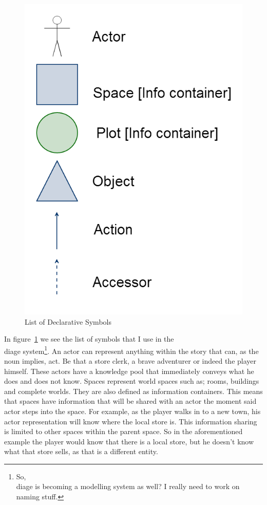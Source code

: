 \documentclass[11pt,a4paper,onecolumn,titlepage]{article}
\newcommand{\diage}{\textsl{Diage }}
\begin{document}
\begin{figure}
\includegraphics[scale=0.3]{symbols}
\caption{List of Declarative Symbols}
\label{fig:symbols}
\end{figure}
In figure~\ref{fig:symbols} we see the list of symbols that I use in the \\diage system\footnote{So, \\diage is becoming a modelling system as well? I really need to work on naming stuff.}. An actor can represent anything within the story that can, as the noun implies, act. Be that a store clerk, a brave adventurer or indeed the player himself. These actors have a knowledge pool that immediately conveys what he does and does not know.
Spaces represent world spaces such as; rooms, buildings and complete worlds. They are also defined as information containers. This means that spaces have information that will be shared with an actor the moment said actor steps into the space. For example, as the player walks in to a new town, his actor representation will know where the local store is. This information sharing is limited to other spaces within the parent space. So in the aforementioned example the player would know that there is a local store, but he doesn't know what that store sells, as that is a different entity.
\end{document}
